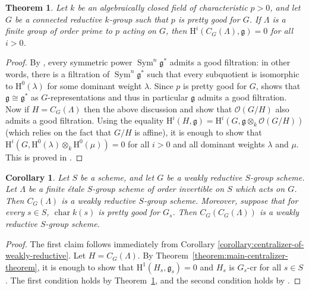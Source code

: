 \documentclass[11pt, letterpaper,english]{amsart}
\theoremstyle{plain}
\newtheorem{theorem}[lem]{Theorem}
\newtheorem{cor}[lem]{Corollary}
\theoremstyle{definition}
\numberwithin{equation}{section}
\numberwithin{lem}{section}
\newcommand{\fg}{\mathfrak{g}}
\newcommand{\cO}{\mathcal{O}}
\DeclareMathOperator{\Sym}{Sym}
\DeclareMathOperator{\chara} {char}
\begin{document}
\begin{theorem}\cite[Proposition VIII.5.12]{Fargues-Scholze}\label{theorem:fargues-scholze-vanishing}
    Let $k$ be an algebraically closed field of characteristic $p > 0$, and let $G$ be a connected reductive $k$-group such that $p$ is pretty good for $G$. If $\Lambda$ is a finite group of order prime to $p$ acting on $G$, then $\mathrm{H}^i(C_G(\Lambda), \fg) = 0$ for all $i > 0$.
\end{theorem}

\begin{proof}
    By \cite[4.4]{Andersen-Jantzen}, every symmetric power $\Sym^n \fg^*$ admits a good filtration: in other words, there is a filtration of $\Sym^n \fg^*$ such that every subquotient is isomorphic to $\mathrm{H}^0(\lambda)$ for some dominant weight $\lambda$. Since $p$ is pretty good for $G$, \cite[Theorem 5.2]{herpel} shows that $\fg \cong \fg^*$ as $G$-representations and thus in particular $\fg$ admits a good filtration. Now if $H = C_G(\Lambda)$ then the above discussion and \cite[Proposition VIII.5.12]{Fargues-Scholze} show that $\cO(G/H)$ also admits a good filtration. Using the equality $\mathrm{H}^i(H, \fg) = \mathrm{H}^i(G, \fg \otimes_k \cO(G/H))$ (which relies on the fact that $G/H$ is affine), it is enough to show that $\mathrm{H}^i(G, \mathrm{H}^0(\lambda) \otimes_k \mathrm{H}^0(\mu)) = 0$ for all $i > 0$ and all dominant weights $\lambda$ and $\mu$. This is proved in \cite[II, 4.13]{Jantzen}.
\end{proof}

\begin{cor}\label{cor:double-centralizer}
Let $S$ be a scheme, and let $G$ be a weakly reductive $S$-group scheme. Let $\Lambda$ be a finite \'etale $S$-group scheme of order invertible on $S$ which acts on $G$. Then $C_G(\Lambda)$ is a weakly reductive $S$-group scheme. 
Moreover, suppose that for every $s \in S$, $\chara k(s)$ is pretty good for $G_s$. Then $C_G(C_G(\Lambda))$ is a weakly reductive $S$-group scheme.
\end{cor}

\begin{proof}
    The first claim follows immediately from Corollary \ref{corollary:centralizer-of-weakly-reductive}.
    Let $H = C_G(\Lambda)$. By Theorem~\ref{theorem:main-centralizer-theorem}, it is enough to show that $\mathrm{H}^1(H_s, \fg_s) = 0$ and $H_s$ is $G_s$-cr for all $s \in S$. The first condition holds by Theorem~\ref{theorem:fargues-scholze-vanishing}, and the second condition holds by \cite[Corollary 3.17]{BMR05}.
\end{proof}
\end{document}
